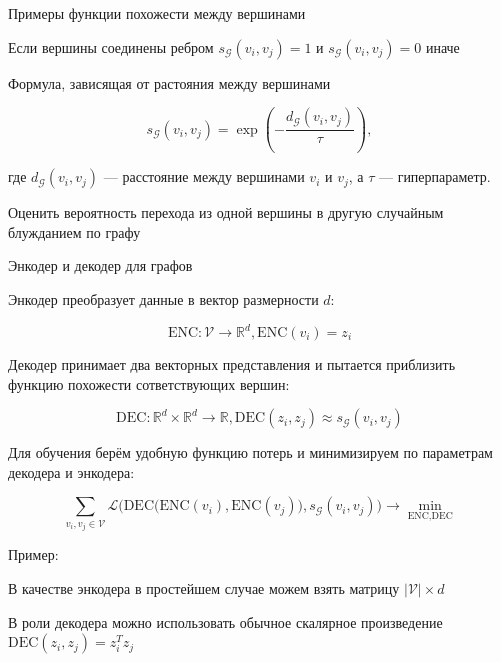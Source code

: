 \documentclass[notes,12pt, aspectratio=169]{beamer}
\newenvironment{wideitemize}{\itemize\addtolength{\itemsep}{10pt}}{\enditemize}
\newcommand{\ENC}{\text{ENC}}
\newcommand{\DEC}{\text{DEC}}
\begin{document}
\begin{frame}{Примеры функции похожести между вершинами}
	\begin{wideitemize}
		\item   Если вершины соединены ребром $s_{\mathcal{G}}(v_i, v_j)=1$ и $s_{\mathcal{G}}(v_i, v_j)=0$ иначе
	
		\item   Формула, зависящая от растояния между вершинами
		
		$$
		s_{\mathcal{G}}(v_i, v_j) = \exp\left(-\frac{d_{\mathcal{G}}(v_i, v_j)}{\tau}\right),
		$$
		
		где $d_{\mathcal{G}}(v_i, v_j)$ — расстояние между вершинами $v_i$ и $v_j$, а $\tau$ — гиперпараметр. 
		
		\item  Оценить вероятность перехода из одной вершины в другую случайным блужданием по графу
				
	\end{wideitemize}
\end{frame}


\begin{frame}{Энкодер и декодер для графов}
	\begin{wideitemize}
		\item  Энкодер преобразует данные в вектор размерности $d$:
		
		\[ \ENC: \mathcal{V} \to \mathbb{R}^d, \ENC(v_i)=z_i \]
		
		\item  Декодер принимает два векторных представления и пытается приблизить функцию похожести сответствующих вершин:
		
		\[ \DEC: \mathbb{R}^d \times \mathbb{R}^d \to \mathbb{R}, \DEC(z_i, z_j)\approx s_{\mathcal{G}}(v_i, v_j) \]
		
		\item Для обучения берём удобную функцию потерь и минимизируем по параметрам декодера и энкодера: 
		
		\[  \sum_{v_i, v_j \in \mathcal{V}} \mathcal{L} \bigg(\DEC\Big(\ENC(v_i), \ENC(v_j)\Big), s_{\mathcal{G}}(v_i, v_j)\bigg) \to \min_{\ENC, \DEC} \]
	\end{wideitemize}
\end{frame}


\begin{frame}{Пример:}
	\begin{wideitemize}
			\item В качестве энкодера в простейшем случае можем взять матрицу  $|\mathcal{V}| \times d$
			
			\item В роли декодера можно использовать обычное скалярное произведение  $\DEC(z_i, z_j) = z_i^T z_j$
	\end{wideitemize}
\end{frame}
\end{document}
